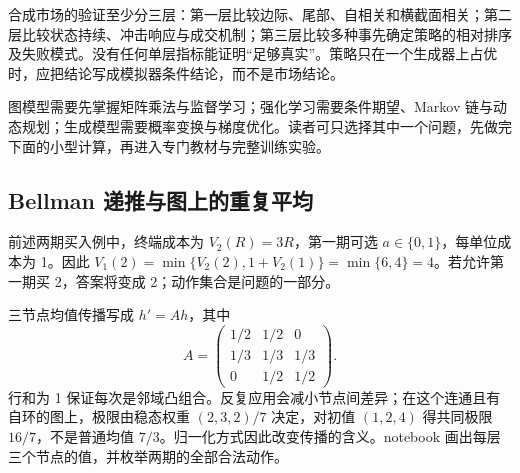 合成市场的验证至少分三层：第一层比较边际、尾部、自相关和横截面相关；第二层比较状态持续、冲击响应与成交机制；第三层比较多种事先确定策略的相对排序及失败模式。没有任何单层指标能证明“足够真实”。策略只在一个生成器上占优时，应把结论写成模拟器条件结论，而不是市场结论。

图模型需要先掌握矩阵乘法与监督学习；强化学习需要条件期望、Markov 链与动态规划；生成模型需要概率变换与梯度优化。读者可只选择其中一个问题，先做完下面的小型计算，再进入专门教材与完整训练实验。


\subsection{Bellman 递推与图上的重复平均}
前述两期买入例中，终端成本为 $V_2(R)=3R$，第一期可选 $a\in\{0,1\}$，每单位成本为 1。因此 $V_1(2)=\min\{V_2(2),1+V_2(1)\}=\min\{6,4\}=4$。若允许第一期买 2，答案将变成 2；动作集合是问题的一部分。

三节点均值传播写成 $h'=Ah$，其中
\[
 A=\begin{pmatrix}1/2&1/2&0\\1/3&1/3&1/3\\0&1/2&1/2\end{pmatrix}.
\]
行和为 1 保证每次是邻域凸组合。反复应用会减小节点间差异；在这个连通且有自环的图上，极限由稳态权重 $(2,3,2)/7$ 决定，对初值 $(1,2,4)$ 得共同极限 $16/7$，不是普通均值 $7/3$。归一化方式因此改变传播的含义。notebook 画出每层三个节点的值，并枚举两期的全部合法动作。

